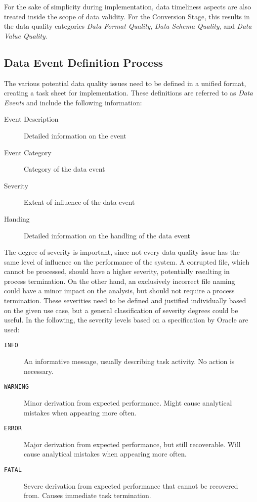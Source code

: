 For the sake of simplicity during implementation, data timeliness aspects are also treated inside the scope of data validity. For the Conversion Stage, this results in the data quality categories \textit{Data Format Quality}, \textit{Data Schema Quality}, and \textit{Data Value Quality}.

\subsection{Data Event Definition Process}
The various potential data quality issues need to be defined in a unified format, creating a task sheet for implementation. These definitions are referred to as \textit{Data Events} and include the following information:

\begin{description}
	\item[Event Description] Detailed information on the event
	\item[Event Category] Category of the data event
	\item[Severity] Extent of influence of the data event
	\item[Handing] Detailed information on the handling of the data event
\end{description}

The degree of severity is important, since not every data quality issue has the same level of influence on the performance of the system. A corrupted file, which cannot be processed, should have a higher severity, potentially resulting in process termination. On the other hand, an exclusively incorrect file naming could have a minor impact on the analysis, but should not require a process termination. These severities need to be defined and justified individually based on the given use case, but a general classification of severity degrees could be useful. In the following, the severity levels based on a specification by Oracle \cite{oracle} are used:

\begin{description}
	\item[\texttt{INFO}] An informative message, usually describing task activity. No action is necessary.
	\item[\texttt{WARNING}] Minor derivation from expected performance. Might cause analytical mistakes when appearing more often.
	\item[\texttt{ERROR}] Major derivation from expected performance, but still recoverable. Will cause analytical mistakes when appearing more often.
	\item[\texttt{FATAL}] Severe derivation from expected performance that cannot be recovered from. Causes immediate task termination.
\end{description}

